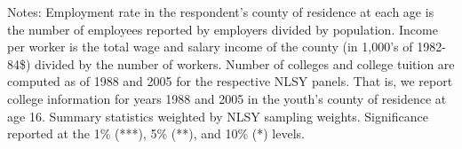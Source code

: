 \begin{table}[ht]
{\begin{threeparttable}
\begin{tabular}{lrrr@{}l}
\bottomrule 
\end{tabular} 
\footnotesize{Notes: Employment rate in the respondent's county of residence at each age is the number of employees reported by employers divided by population. Income per worker is the total wage and salary income of the county (in 1,000's of 1982-84\$) divided by the number of workers. Number of colleges and college tuition are computed as of 1988 and 2005 for the respective NLSY panels. That is, we report college information for years 1988 and 2005 in the youth's county of residence at age 16. Summary statistics weighted by NLSY sampling weights. Significance reported at the 1\% (***), 5\% (**), and 10\% (*) levels.}
\end{threeparttable} 
} 
\end{table} 

